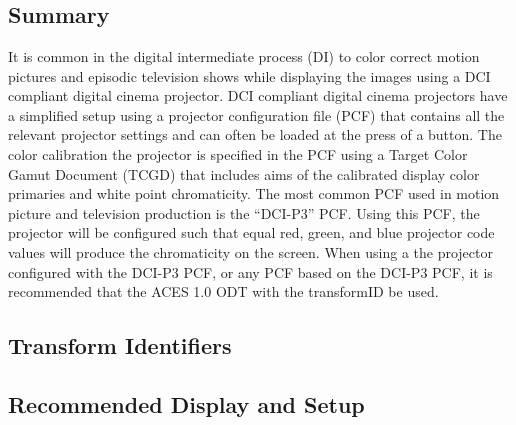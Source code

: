 \section[P3-DCI]{\shortName{\id}}
\label{sec:odt-details-\id}

\subsection{Summary}
\label{subsec:summary-\id}

It is common in the digital intermediate process (DI) to color correct motion pictures and episodic television shows while displaying the images using a DCI compliant digital cinema projector. DCI compliant digital cinema projectors have a simplified setup using a projector configuration file (PCF) that contains all the relevant projector settings and can often be loaded at the press of a button. The color calibration the projector is specified in the PCF using a Target Color Gamut Document (TCGD) that includes aims of the calibrated display color primaries and white point chromaticity.  The most common PCF used in motion picture and television production is the ``DCI-P3'' PCF. Using this PCF, the projector will be configured such that equal red, green, and blue projector code values will produce the chromaticity  on the screen. When using a the projector configured with the DCI-P3 PCF, or any PCF based on the DCI-P3 PCF, it is recommended that the ACES 1.0 ODT with the transformID \transformID{\id} be used.

\subsection{Transform Identifiers} 
\label{subsec:odt-ident-\id}

\subsection{Recommended Display and Setup}
\label{subsec:setup-\id}

